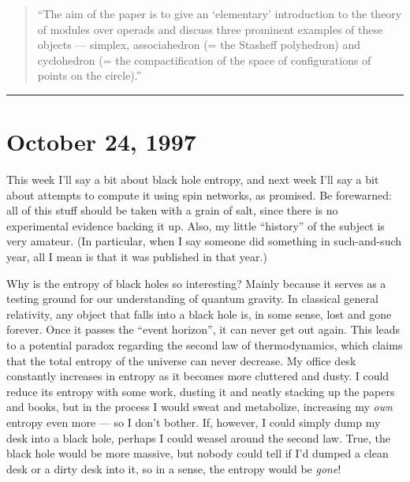 \documentclass{article}
\def\tightlist{}
\renewcommand{\texttt}[1]{%
  \begingroup
  \ttfamily
  \begingroup\lccode`~=`/\lowercase{\endgroup\def~}{/\discretionary{}{}{}}%
  \begingroup\lccode`~=`[\lowercase{\endgroup\def~}{[\discretionary{}{}{}}%
  \begingroup\lccode`~=`.\lowercase{\endgroup\def~}{.\discretionary{}{}{}}%
  \catcode`/=\active\catcode`[=\active\catcode`.=\active
  \scantokens{#1\noexpand}%
  \endgroup
}
\begin{document}

\begin{quote}
``The aim of the paper is to give an `elementary' introduction to the
theory of modules over operads and discuss three prominent examples of
these objects --- simplex, associahedron (= the Stasheff polyhedron) and
cyclohedron (= the compactification of the space of configurations of
points on the circle).''
\end{quote}

\begin{center}\rule{0.5\linewidth}{0.5pt}\end{center}
\hypertarget{week111}{%
\section{October 24, 1997}\label{week111}}

This week I'll say a bit about black hole entropy, and next week I'll
say a bit about attempts to compute it using spin networks, as promised.
Be forewarned: all of this stuff should be taken with a grain of salt,
since there is no experimental evidence backing it up. Also, my little
``history'' of the subject is very amateur. (In particular, when I say
someone did something in such-and-such year, all I mean is that it was
published in that year.)

Why is the entropy of black holes so interesting? Mainly because it
serves as a testing ground for our understanding of quantum gravity. In
classical general relativity, any object that falls into a black hole
is, in some sense, lost and gone forever. Once it passes the ``event
horizon'', it can never get out again. This leads to a potential paradox
regarding the second law of thermodynamics, which claims that the total
entropy of the universe can never decrease. My office desk constantly
increases in entropy as it becomes more cluttered and dusty. I could
reduce its entropy with some work, dusting it and neatly stacking up the
papers and books, but in the process I would sweat and metabolize,
increasing my \emph{own} entropy even more --- so I don't bother. If,
however, I could simply dump my desk into a black hole, perhaps I could
weasel around the second law. True, the black hole would be more
massive, but nobody could tell if I'd dumped a clean desk or a dirty
desk into it, so in a sense, the entropy would be \emph{gone}!
\end{document}
